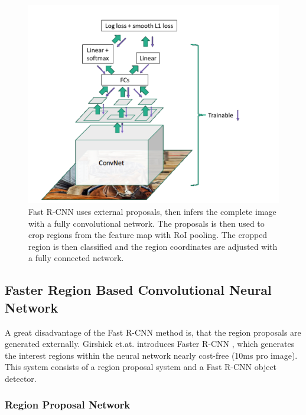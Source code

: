 \bigbreak
\begin{figure}[h!]
	\centering
	\includegraphics[width=12cm]{images/mt/fast-rcnn.png}
	\caption{Fast R-CNN uses external proposals, then infers the complete image with a fully convolutional network. The proposals is then used to crop regions from the feature map with RoI pooling. The cropped region is then classified and the region coordinates are adjusted with a fully connected network.}
	\label{fig:fastrcnn}
\end{figure}
\bigbreak
\subsection{Faster Region Based Convolutional Neural Network}\label{s:fasterrcnn}

A great disadvantage of the Fast R-CNN method is, that the region proposals are generated externally. Girshick et.at. introduces Faster R-CNN \cite{NIPS2015_5638}, which generates the interest regions within the neural network nearly cost-free (10ms pro image). This system consists of a region proposal system and a Fast R-CNN object detector.
\bigbreak
\subsubsection{Region Proposal Network}

